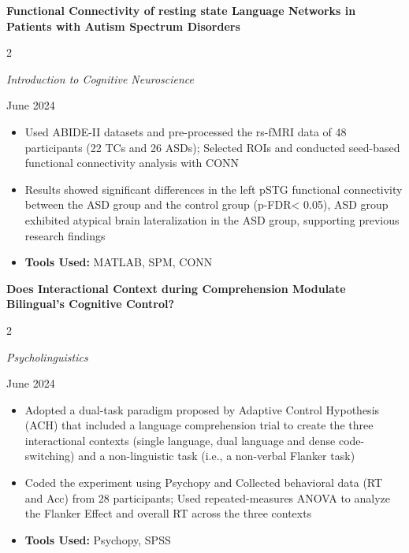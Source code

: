 \documentclass[10pt, letterpaper]{article}
\newenvironment{highlights}{
    \begin{itemize}[
        topsep=0.10 cm,
        parsep=0.10 cm,
        partopsep=0pt,
        itemsep=0pt,
        leftmargin=0 cm + 10pt
    ]
}{
    \end{itemize}
} %
\newenvironment{twocolentry}[2][]{
    \onecolentry
    \def\secondColumn{#2}
    \setcolumnwidth{\fill, 4.5 cm}
    \begin{paracol}{2}
}{
    \switchcolumn \raggedleft \secondColumn
    \end{paracol}
    \endonecolentry
} %
\begin{document}
    \begin{samepage}

        \textbf{Functional Connectivity of resting state Language Networks in Patients with Autism Spectrum Disorders}

        \vspace{0.10cm}

        \begin{twocolentry}{
            June 2024
        }
            \textit{Introduction to Cognitive Neuroscience}
        \end{twocolentry}

        \vspace{0.10 cm}

        \begin{highlights}
            \item Used ABIDE-II datasets and pre-processed the rs-fMRI data of 48 participants (22 TCs and 26 ASDs); Selected ROIs and conducted seed-based functional connectivity analysis with CONN  
            \item Results showed significant differences in the left pSTG functional connectivity between the ASD group and the control group (p-FDR< 0.05), ASD group exhibited atypical brain lateralization in the ASD group, supporting previous research findings  
            \item \textbf{Tools Used:} MATLAB, SPM, CONN
        \end{highlights}
        
      
    \end{samepage}
    
    \newpage
      
    \begin{samepage}
        \textbf{Does Interactional Context during Comprehension Modulate Bilingual’s Cognitive Control?}

        \vspace{0.10cm}

        \begin{twocolentry}{
            June 2024
        }
            \textit{Psycholinguistics}
        \end{twocolentry}

         \vspace{0.10 cm}

         \begin{highlights}
            \item Adopted a dual-task paradigm proposed by Adaptive Control Hypothesis (ACH) that included a language comprehension trial to create the three interactional contexts (single language, dual language and dense code-switching) and a non-linguistic task (i.e., a non-verbal Flanker task)   
            \item Coded the experiment using Psychopy and Collected behavioral data (RT and Acc) from 28 participants; Used repeated-measures ANOVA to analyze the Flanker Effect and overall RT across the three contexts   
            \item \textbf{Tools Used:} Psychopy, SPSS
         \end{highlights}

    \end{samepage}
\end{document}
